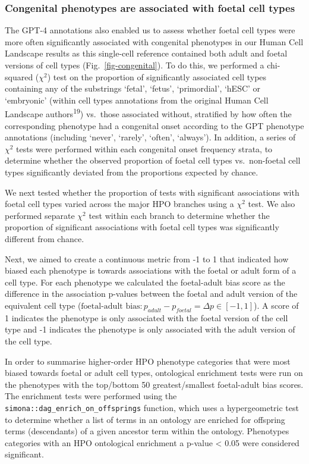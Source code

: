 \documentclass[
]{article}
\begin{document}
\subsubsection{Congenital phenotypes are associated with foetal cell
types}\label{congenital-phenotypes-are-associated-with-foetal-cell-types-1}

The GPT-4 annotations also enabled us to assess whether foetal cell
types were more often significantly associated with congenital
phenotypes in our Human Cell Landscape results as this single-cell
reference contained both adult and foetal versions of cell types
(Fig.~\ref{fig-congenital}). To do this, we performed a chi-squared
(\(\chi^2\)) test on the proportion of significantly associated cell
types containing any of the substrings `fetal', `fetus', `primordial',
`hESC' or `embryonic' (within cell types annotations from the original
Human Cell Landscape authors\textsuperscript{19}) vs.~those associated
without, stratified by how often the corresponding phenotype had a
congenital onset according to the GPT phenotype annotations (including
`never', `rarely', `often', `always'). In addition, a series of
\(\chi^2\) tests were performed within each congenital onset frequency
strata, to determine whether the observed proportion of foetal cell
types vs.~non-foetal cell types significantly deviated from the
proportions expected by chance.

We next tested whether the proportion of tests with significant
associations with foetal cell types varied across the major HPO branches
using a \(\chi^2\) test. We also performed separate \(\chi^2\) test
within each branch to determine whether the proportion of significant
associations with foetal cell types was significantly different from
chance.

Next, we aimed to create a continuous metric from -1 to 1 that indicated
how biased each phenotype is towards associations with the foetal or
adult form of a cell type. For each phenotype we calculated the
foetal-adult bias score as the difference in the association p-values
between the foetal and adult version of the equivalent cell type
(\(\text{foetal-adult bias}: p_{adult} - p_{foetal} = \Delta p \in [-1,1]\)).
A score of 1 indicates the phenotype is only associated with the foetal
version of the cell type and -1 indicates the phenotype is only
associated with the adult version of the cell type.

In order to summarise higher-order HPO phenotype categories that were
most biased towards foetal or adult cell types, ontological enrichment
tests were run on the phenotypes with the top/bottom 50
greatest/smallest foetal-adult bias scores. The enrichment tests were
performed using the \texttt{simona::dag\_enrich\_on\_offsprings}
function, which uses a hypergeometric test to determine whether a list
of terms in an ontology are enriched for offspring terms (descendants)
of a given ancestor term within the ontology. Phenotypes categories with
an HPO ontological enrichment a p-value \textless{} 0.05 were considered
significant.
\end{document}
